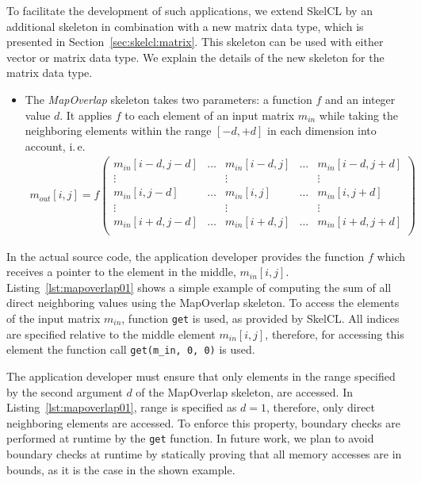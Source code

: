 To facilitate the development of such applications, we extend SkelCL by an additional skeleton in combination with a new matrix data type, which is presented in Section~\ref{sec:skelcl:matrix}.
This skeleton can be used with either vector or matrix data type.
We explain the details of the new skeleton for the matrix data type.
\begin{itemize}
  \item The \emph{MapOverlap} skeleton takes two parameters: a function $f$ and an integer value $d$.
   It applies $f$ to each element of an input matrix $m_{in}$ while taking the neighboring elements within the range $[-d, +d]$ in each dimension into account, i.\,e.
  \begin{align*}
m_{out}[i,j]=f\left(
\begin{array}{ccccc}
m_{in}[i-d,j-d] & \hdots & m_{in}[i-d,j] & \hdots & m_{in}[i-d,j+d] \\
\vdots & ~ & \vdots & ~ & \vdots \\
m_{in}[i,j-d] & \hdots & m_{in}[i,j] & \hdots & m_{in}[i,j+d]\\
\vdots & ~ & \vdots & ~ & \vdots \\
m_{in}[i+d,j-d] & \hdots & m_{in}[i+d,j] & \hdots & m_{in}[i+d,j+d] \\
\end{array}
\right)
\end{align*}
\end{itemize}

In the actual source code, the application developer provides the function $f$ which receives a pointer to the element in the middle, $m_{in}[i,j]$.
Listing~\ref{lst:mapoverlap01} shows a simple example of computing the sum of all direct neighboring values using the MapOverlap skeleton.
To access the elements of the input matrix $m_{in}$, function \texttt{get} is used, as provided by SkelCL.
All indices are specified relative to the middle element $m_{in}[i,j]$, therefore, for accessing this element the function call \texttt{get(m\_in, 0, 0)} is used.

The application developer must ensure that only elements in the range specified by the second argument $d$ of the MapOverlap skeleton, are accessed.
In Listing~\ref{lst:mapoverlap01}, range is specified as $d=1$, therefore, only direct neighboring elements are accessed.
To enforce this property, boundary checks are performed at runtime by the \texttt{get} function.
In future work, we plan to avoid boundary checks at runtime by statically proving that all memory accesses are in bounds, as it is the case in the shown example.

